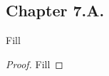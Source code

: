 \subsection*{Chapter 7.A. }


\begin{exercise}{1}
  Fill
\end{exercise}
\begin{proof}
 Fill
\end{proof}